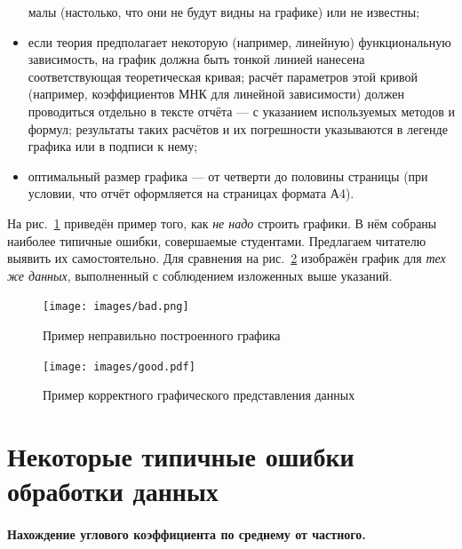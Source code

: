 \begin{itemize}
малы (настолько, что они не будут видны на графике) или не известны;
    \item если теория предполагает некоторую (например, линейную) функциональную
зависимость, на график должна быть тонкой линией нанесена соответствующая
теоретическая кривая; расчёт параметров этой кривой (например, коэффициентов
МНК для линейной зависимости) должен проводиться отдельно в тексте
отчёта --- с указанием используемых методов и формул; результаты
таких расчётов и их погрешности указываются в легенде графика или
в подписи к нему;
    \item оптимальный размер графика --- от четверти до половины страницы
(при условии, что отчёт оформляется на страницах формата А4).
\end{itemize}

На рис.~\ref{fig:incorrect} приведён пример того, как \emph{не надо}
строить графики. В нём собраны наиболее типичные ошибки, совершаемые
студентами. Предлагаем читателю выявить их самостоятельно. Для сравнения
на рис.~\ref{fig:correct} изображён график для \emph{тех же данных},
выполненный с соблюдением изложенных выше указаний.
\begin{figure}[ht]
\begin{centering}
\texttt{[image: images/bad.png]}
\par\end{centering}
\caption{\label{fig:incorrect}Пример неправильно построенного графика}
\end{figure}
\begin{figure}[ht!]
\begin{centering}
\texttt{[image: images/good.pdf]}
\par\end{centering}
\caption{\label{fig:correct}Пример корректного графического представления
    данных}
\end{figure}


\section{Некоторые типичные ошибки обработки данных}

\paragraph{Нахождение углового коэффициента по среднему от частного.}

